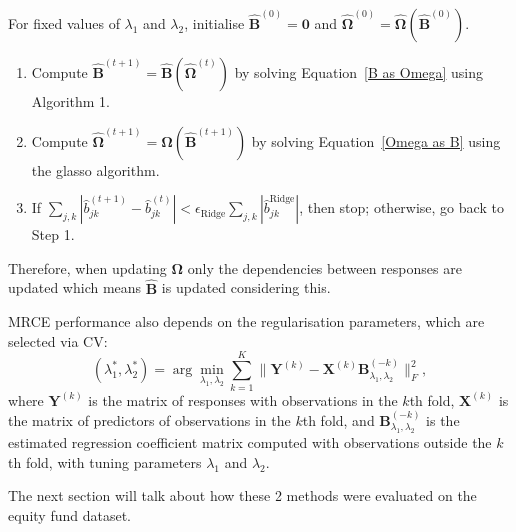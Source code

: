 \documentclass[11pt]{report} %
\begin{document}
\vspace{0.1cm}
\noindent For fixed values of \( \lambda_1 \) and \( \lambda_2 \), initialise \( \hat{\mathbf{B}}^{(0)} = \mathbf{0} \) and \( \hat{\mathbf{\Omega}}^{(0)} = \hat{\mathbf{\Omega}}(\hat{\mathbf{B}}^{(0)}) \). 
\begin{enumerate}
    \item Compute \( \hat{\mathbf{B}}^{(t+1)} = \hat{\mathbf{B}}(\hat{\mathbf{\Omega}}^{(t)}) \) by solving Equation~\ref{B as Omega} using Algorithm 1.

    \item Compute \( \hat{\mathbf{\Omega}}^{(t+1)} = \hat{\mathbf{\Omega}}(\hat{\mathbf{B}}^{(t+1)}) \) by solving Equation~\ref{Omega as B} using the glasso algorithm.

    \item If $\sum_{j,k} \left| \hat{b}^{(t+1)}_{jk} - \hat{b}^{(t)}_{jk} \right| < \epsilon_\text{Ridge} \sum_{j,k} \left| \hat{b}^{\text{Ridge}}_{jk} \right|$,
then stop; otherwise, go back to Step 1.
\end{enumerate}

\noindent Therefore, when updating $\mathbf{\Omega}$ only the dependencies between responses are updated which means $\mathbf{\hat{B}}$ is updated considering this.


MRCE performance also depends on the regularisation parameters, which are selected via CV:
\begin{equation*}
    (\lambda_1^*, \lambda_2^*) = \arg \min_{\lambda_1, \lambda_2} \sum_{k=1}^{K} \| \mathbf{Y}^{(k)} - \mathbf{X}^{(k)} \mathbf{B}_{\lambda_1, \lambda_2}^{(-k)} \|_F^2,
\end{equation*}
where \( \mathbf{Y}^{(k)} \) is the matrix of responses with observations in the \( k \)th fold, \( \mathbf{X}^{(k)} \) is the matrix of predictors of observations in the \( k \)th fold, and \( \mathbf{B}_{\lambda_1, \lambda_2}^{(-k)} \) is the estimated regression coefficient matrix computed with observations outside the \( k \)th fold, 
with tuning parameters \( \lambda_1 \) and \( \lambda_2 \).\cite{rothman2010sparse} 

\noindent The next section will talk about how these 2 methods were evaluated on the equity fund dataset.

\vspace{-0.2cm}
\end{document}
